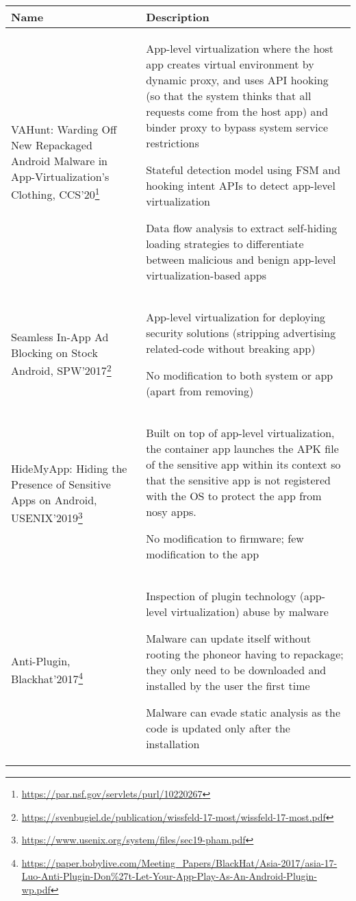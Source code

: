 \begin{longtable}{p{.3\linewidth}p{.65\linewidth}} 
\toprule
Name & Description \\
\midrule
\endhead

VAHunt: Warding Off New Repackaged Android Malware in App-Virtualization’s Clothing, CCS'20\footnote{\url{https://par.nsf.gov/servlets/purl/10220267}}
&App-level virtualization where the host app creates virtual environment by dynamic proxy, and uses API hooking (so that the system thinks that all requests come from the host app) and binder proxy to bypass system service restrictions

Stateful detection model using FSM and hooking intent APIs to detect app-level virtualization

Data flow analysis to extract self-hiding loading strategies to differentiate between malicious and benign app-level virtualization-based apps
\\

Seamless In-App Ad Blocking on Stock Android, SPW'2017\footnote{\url{https://svenbugiel.de/publication/wissfeld-17-most/wissfeld-17-most.pdf}}
&App-level virtualization for deploying security solutions (stripping advertising related-code without breaking app)

No modification to both system or app (apart from removing)
\\

HideMyApp: Hiding the Presence of Sensitive Apps on Android, USENIX'2019\footnote{\url{https://www.usenix.org/system/files/sec19-pham.pdf}}
&Built on top of app-level virtualization, the container app launches the APK file of the sensitive app within its context so that the sensitive app is not registered with the OS to protect the app from nosy apps. 

No modification to firmware; few modification to the app
\\

Anti-Plugin, Blackhat'2017\footnote{\url{https://paper.bobylive.com/Meeting_Papers/BlackHat/Asia-2017/asia-17-Luo-Anti-Plugin-Don\%27t-Let-Your-App-Play-As-An-Android-Plugin-wp.pdf}}
&Inspection of plugin technology (app-level virtualization) abuse by malware

Malware can update itself without rooting the phoneor having to repackage; they only need to be downloaded and installed by the user the first time

Malware can evade static analysis as the code is updated only after the installation
\\


\end{longtable}
